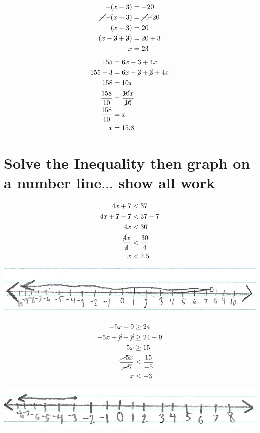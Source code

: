 \documentclass[11pt]{article} %
\begin{document}
\begin{align*}
-(x-3) &= -20 \\
{\cancel{-}} {\cancel{-}} (x - 3) &= {\cancel{-}}{\cancel{-}} 20 \\
(x - 3) &= 20 \\
(x - {\cancel{3}} + {\cancel{3}}) &= 20 + 3 \\
x &= 23
\end{align*}
\begin{align*}
155 &= 6x - 3 + 4x \\
155 + 3 &= 6x - {\cancel{3}} + {\cancel{3}} + 4x \\
158 &= 10x \\
\frac{158}{10} &= \frac{\cancel{10}x}{\cancel{10}} \\
\frac{158}{10} &= x \\
x &= 15.8
\end{align*}

\section{Solve the Inequality then graph on a number line$\ldots$ show all work}

\begin{align*}
4x + 7 &< 37 \\
4x + \cancel{7} - \cancel{7} &< 37 - 7 \\
4x &< 30 \\
\frac{\cancel{4}x}{\cancel{4}} &< \frac{30}{4} \\
x &< 7.5
\end{align*}

\includegraphics{ineq_1}

\begin{align*}
-5x + 9 &\geq 24 \\
-5x + {\cancel{9}} -{\cancel{9}} &\geq 24 - 9 \\
-5x &\geq 15 \\
\frac{\cancel{-5}x}{\cancel{-5}} &\leq \frac{15}{-5} \\
x &\leq -3
\end{align*}

\includegraphics{ineq_2}
\end{document}
